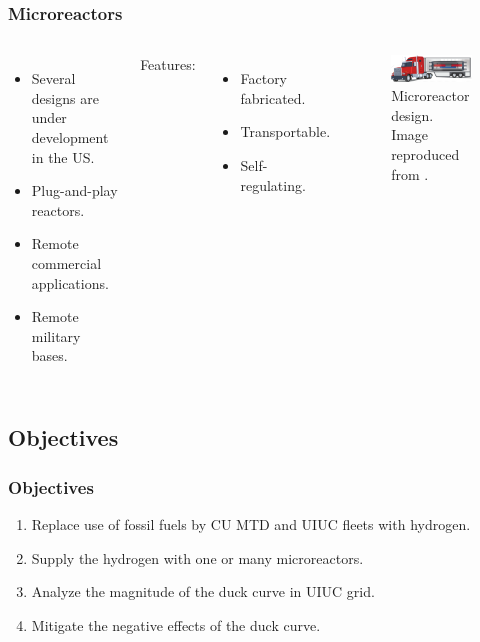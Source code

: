 \begin{frame}
\frametitle{Microreactors}
\begin{columns}
	\column[t]{5cm}
	\begin{itemize}
		\item Several designs are under development in the US.
		\item Plug-and-play reactors.
		\item Remote commercial applications.
		\item Remote military bases.
	\end{itemize}
	\vspace{0.6cm}
	Features:
	\begin{itemize}
		\item Factory fabricated.
		\item Transportable.
		\item Self-regulating.
	\end{itemize}

    \column[t]{6cm}
	\begin{figure}[htbp!]
		\begin{center}
			\includegraphics[width=5.8cm]{images/microreactor}
		\end{center}
		\caption{Microreactor design. Image reproduced from \cite{us-doe_ultimate_2019}.}
	\end{figure}
\end{columns}
\end{frame}

\subsection{Objectives}
\begin{frame}
\frametitle{Objectives}
\centering
    \begin{enumerate}
    	\item Replace use of fossil fuels by CU MTD and UIUC fleets with hydrogen.
    	\item Supply the hydrogen with one or many microreactors.
    	\item Analyze the magnitude of the duck curve in UIUC grid.
        \item Mitigate the negative effects of the duck curve.
	\end{enumerate}
\end{frame}